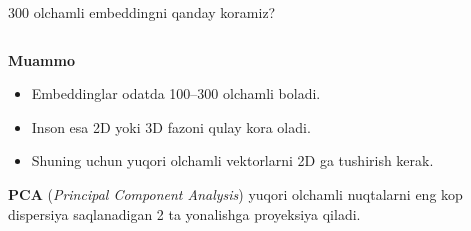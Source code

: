 \documentclass[aspectratio=169,11pt]{beamer}
\begin{document}
\begin{frame}{300 o\textquotesingle{}lchamli embeddingni qanday ko\textquotesingle{}ramiz?}
\small

\begin{columns}[T,totalwidth=\textwidth]
\begin{column}{0.47\textwidth}

\textbf{Muammo}

\vspace{3pt}
\begin{itemize}\setlength\itemsep{5pt}
  \item Embeddinglar odatda 100--300 o\textquotesingle{}lchamli bo\textquotesingle{}ladi.
  \item Inson esa 2D yoki 3D fazoni qulay ko\textquotesingle{}ra oladi.
  \item Shuning uchun yuqori o\textquotesingle{}lchamli vektorlarni 2D ga tushirish kerak.
\end{itemize}

\vspace{5pt}

\begin{tcolorbox}[defbox]
\footnotesize
\textbf{PCA} (\textit{Principal Component Analysis}) yuqori
o\textquotesingle{}lchamli nuqtalarni eng ko\textquotesingle{}p dispersiya
saqlanadigan 2 ta yo\textquotesingle{}nalishga proyeksiya qiladi.
\end{tcolorbox}

\end{column}

\begin{column}{0.49\textwidth}
\centering

\end{column}
\end{columns}
\end{frame}
\end{document}
